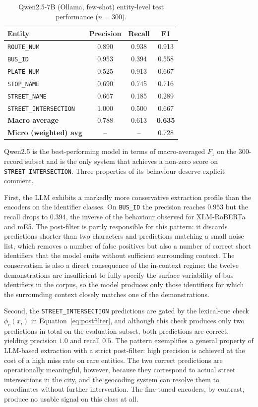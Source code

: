 \begin{table}[H]
\centering
\caption{Qwen2.5-7B (Ollama, few-shot) entity-level test performance ($n=300$).}
\label{tab:qwen}
\renewcommand{\arraystretch}{1.3}
\begin{tabular}{lccc}
\toprule
\textbf{Entity} & \textbf{Precision} & \textbf{Recall} & \textbf{F1} \\
\midrule
\texttt{ROUTE\_NUM}           & 0.890 & 0.938 & 0.913 \\
\texttt{BUS\_ID}              & 0.953 & 0.394 & 0.558 \\
\texttt{PLATE\_NUM}           & 0.525 & 0.913 & 0.667 \\
\texttt{STOP\_NAME}           & 0.690 & 0.745 & 0.716 \\
\texttt{STREET\_NAME}         & 0.667 & 0.185 & 0.289 \\
\texttt{STREET\_INTERSECTION} & 1.000 & 0.500 & 0.667 \\
\midrule
\textbf{Macro average}        & 0.788 & 0.613 & \textbf{0.635} \\
\textbf{Micro (weighted) avg} & --    & --    & 0.728 \\
\bottomrule
\end{tabular}
\end{table}

Qwen2.5 is the best-performing model in terms of macro-averaged $F_1$ on the 300-record subset and is the only system that achieves a non-zero score on \texttt{STREET\_INTERSECTION}. Three properties of its behaviour deserve explicit comment.

First, the LLM exhibits a markedly more conservative extraction profile than the encoders on the identifier classes. On \texttt{BUS\_ID} the precision reaches $0.953$ but the recall drops to $0.394$, the inverse of the behaviour observed for XLM-RoBERTa and mE5. The post-filter is partly responsible for this pattern: it discards predictions shorter than two characters and predictions matching a small noise list, which removes a number of false positives but also a number of correct short identifiers that the model emits without sufficient surrounding context. The conservatism is also a direct consequence of the in-context regime: the twelve demonstrations are insufficient to fully specify the surface variability of bus identifiers in the corpus, so the model produces only those identifiers for which the surrounding context closely matches one of the demonstrations.

Second, the \texttt{STREET\_INTERSECTION} predictions are gated by the lexical-cue check $\phi_c(x_i)$ in Equation~\eqref{eq:postfilter}, and although this check produces only two predictions in total on the evaluation subset, both predictions are correct, yielding precision $1.0$ and recall $0.5$. The pattern exemplifies a general property of LLM-based extraction with a strict post-filter: high precision is achieved at the cost of a high miss rate on rare entities. The two correct predictions are operationally meaningful, however, because they correspond to actual street intersections in the city, and the geocoding system can resolve them to coordinates without further intervention. The fine-tuned encoders, by contrast, produce no usable signal on this class at all.


